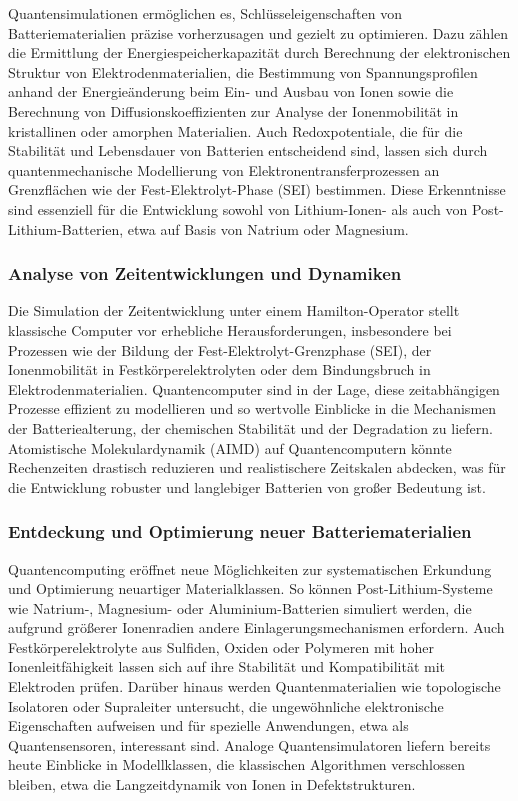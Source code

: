 Quantensimulationen ermöglichen es, Schlüsseleigenschaften von Batteriematerialien präzise vorherzusagen und gezielt zu optimieren. Dazu zählen die Ermittlung der Energiespeicherkapazität durch Berechnung der elektronischen Struktur von Elektrodenmaterialien, die Bestimmung von Spannungsprofilen anhand der Energieänderung beim Ein- und Ausbau von Ionen sowie die Berechnung von Diffusionskoeffizienten zur Analyse der Ionenmobilität in kristallinen oder amorphen Materialien. Auch Redoxpotentiale, die für die Stabilität und Lebensdauer von Batterien entscheidend sind, lassen sich durch quantenmechanische Modellierung von Elektronentransferprozessen an Grenzflächen wie der Fest-Elektrolyt-Phase (SEI) bestimmen. Diese Erkenntnisse sind essenziell für die Entwicklung sowohl von Lithium-Ionen- als auch von Post-Lithium-Batterien, etwa auf Basis von Natrium oder Magnesium.

\subsubsection*{Analyse von Zeitentwicklungen und Dynamiken}

Die Simulation der Zeitentwicklung unter einem Hamilton-Operator stellt klassische Computer vor erhebliche Herausforderungen, insbesondere bei Prozessen wie der Bildung der Fest-Elektrolyt-Grenzphase (SEI), der Ionenmobilität in Festkörperelektrolyten oder dem Bindungsbruch in Elektrodenmaterialien. Quantencomputer sind in der Lage, diese zeitabhängigen Prozesse effizient zu modellieren und so wertvolle Einblicke in die Mechanismen der Batteriealterung, der chemischen Stabilität und der Degradation zu liefern. Atomistische Molekulardynamik (AIMD) auf Quantencomputern könnte Rechenzeiten drastisch reduzieren und realistischere Zeitskalen abdecken, was für die Entwicklung robuster und langlebiger Batterien von großer Bedeutung ist.

\subsubsection*{Entdeckung und Optimierung neuer Batteriematerialien}

Quantencomputing eröffnet neue Möglichkeiten zur systematischen Erkundung und Optimierung neuartiger Materialklassen. So können Post-Lithium-Systeme wie Natrium-, Magnesium- oder Aluminium-Batterien simuliert werden, die aufgrund größerer Ionenradien andere Einlagerungsmechanismen erfordern. Auch Festkörperelektrolyte aus Sulfiden, Oxiden oder Polymeren mit hoher Ionenleitfähigkeit lassen sich auf ihre Stabilität und Kompatibilität mit Elektroden prüfen. Darüber hinaus werden Quantenmaterialien wie topologische Isolatoren oder Supraleiter untersucht, die ungewöhnliche elektronische Eigenschaften aufweisen und für spezielle Anwendungen, etwa als Quantensensoren, interessant sind. Analoge Quantensimulatoren liefern bereits heute Einblicke in Modellklassen, die klassischen Algorithmen verschlossen bleiben, etwa die Langzeitdynamik von Ionen in Defektstrukturen.

